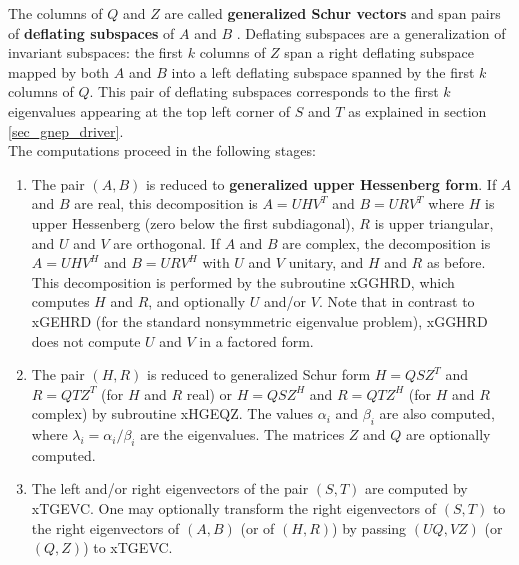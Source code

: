 The columns of $Q$ and $Z$ are called {\bf generalized Schur vectors}
and span pairs of {\bf deflating subspaces} of $A$ and $B$ \cite{stewart73}.
Deflating subspaces are a generalization of invariant subspaces: the first $k$
columns of $Z$ span a right deflating subspace mapped by both $A$ and
$B$ into a left deflating subspace spanned by the first $k$ columns of
$Q$.  This pair of deflating subspaces corresponds to the first $k$
eigenvalues appearing at the top left corner of $S$ and $T$ as explained
in section \ref{sec_gnep_driver}. \\

The computations proceed in the following stages:

\begin{enumerate}

\item The pair $(A,B)$ is reduced to {\bf generalized upper Hessenberg form}.
      If $A$ and $B$ are real, this decomposition is $A = UHV^T$
      and $B = U R V^T$ where $H$ is upper Hessenberg (zero below the
      first subdiagonal), $R$ is upper triangular, and $U$ and $V$
      are orthogonal.  If $A$ and $B$ are complex, the decomposition is
      $A = UHV^H$ and $B = URV^H$ with $U$ and $V$ unitary, and $H$
      and $R$ as before.  This decomposition is performed by the
      subroutine xGGHRD,
      which computes $H$ and $R$, and optionally
      $U$ and/or $V$.  Note that in contrast to xGEHRD (for the standard
      nonsymmetric eigenvalue problem), xGGHRD does not compute $U$ and
      $V$ in a factored form.

\item The pair $(H,R)$ is reduced to generalized Schur form
      $H = QSZ^T$ and $R = QTZ^T$ (for $H$ and $R$ real) or
      $H = QSZ^H$ and $R = QTZ^H$ (for $H$ and $R$ complex)
      by subroutine xHGEQZ.
      The values $\alpha_i$ and $\beta_i$ are also
      computed, where $\lambda_i = \alpha_i / \beta_i$ are the
      eigenvalues. The matrices $Z$ and $Q$ are optionally computed.

\item The left and/or right eigenvectors of the pair $(S,T)$ are
      computed by xTGEVC.
      One may optionally transform the right
      eigenvectors of $(S,T)$ to the right eigenvectors of $(A,B)$
      (or of $(H,R)$) by passing $(UQ,VZ)$ (or $(Q,Z)$) to xTGEVC.

\end{enumerate}

